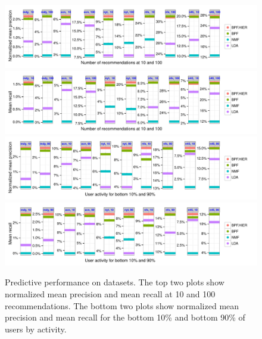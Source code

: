 
\begin{figure}[t!]
\centering
\includegraphics[width=\textwidth]{./figures/meanprecision2.pdf}\\               
\includegraphics[width=\textwidth]{./figures/meanrecall2.pdf}\\               
\includegraphics[width=\textwidth]{./figures/useractivity-meanprecision2.pdf}\\
\includegraphics[width=\textwidth]{./figures/useractivity-meanrecall2.pdf}\\
\caption{Predictive performance on datasets. The top two plots show
  normalized mean precision and mean recall at 10 and 100
  recommendations. The bottom two plots show normalized mean precision
  and mean recall for the bottom 10\% and bottom 90\% of users by
  activity.}
\label{fig:precision_by_M}
\end{figure}



